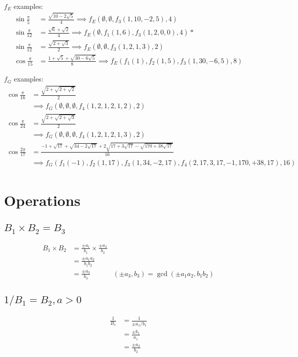 \documentclass{article}
\begin{document}
$f_E$ examples:
\begin{align*}
\sin{\frac{\pi}{5}}  &= \frac{\sqrt{10-2\sqrt{5}}}{4} \implies f_E(\emptyset,\emptyset,f_3(1,10,-2,5),4)\\
\sin{\frac{\pi}{12}} &= \frac{\sqrt{6} + \sqrt{2}}{4} \implies f_E(\emptyset,f_1(1,6),f_3(1,2,0,0),4) *\\
\sin{\frac{\pi}{12}} &= \frac{\sqrt{2 + \sqrt{3}}}{2} \implies f_E(\emptyset,\emptyset,f_3(1,2,1,3),2)\\
\cos{\frac{\pi}{15}} &= \frac{1+\sqrt{5}+\sqrt{30-6\sqrt{5}}}{8} \implies f_E(f_1(1),f_2(1,5),f_3(1,30,-6,5),8)
\end{align*}

$f_G$ examples:
\begin{align*}
\cos{\frac{\pi}{16}} &= \frac{\sqrt{2+\sqrt{2+\sqrt{2}}}}{2}
  \\&\implies f_G(\emptyset,\emptyset,\emptyset,f_4(1,2,1,2,1,2),2)\\
\cos{\frac{\pi}{24}} &= \frac{\sqrt{2+\sqrt{2+\sqrt{3}}}}{2}
  \\&\implies f_G(\emptyset,\emptyset,\emptyset,f_4(1,2,1,2,1,3),2)\\
\cos{\frac{2\pi}{17}} &=
\frac{-1+\sqrt{17}+\sqrt{34-2\sqrt{17}}+2\sqrt{17+3\sqrt{17}-\sqrt{170+38\sqrt{17}}}}{16}
    \\&\implies f_G(f_1(-1),f_2(1,17),f_3(1,34,-2,17),f_4(2,17,3,17,-1,170,+38,17),16)\\
\end{align*}

\section{Operations}

\subsection{$B_1 \times B_2 = B_3$}
\begin{align*}
B_1 \times B_2 &= \frac{\pm a_1}{b_1} \times \frac{\pm a_2}{b_2} \\
  &= \frac{\pm a_1a_2}{b_1b_2} \\
  &= \frac{\pm a_3}{b_3} & (\pm a_3,b_3) = \gcd(\pm a_1a_2, b_1b_2)
\end{align*}

\subsection{$1 / B_1 = B_2, a > 0$}
\begin{align*}
\frac{1}{B_1} &= \frac{1}{\pm a_1 / b_1}\\
 &= \frac{\pm b_1}{a_1} \\
 &= \frac{\pm a_2}{b_2}
\end{align*}
\end{document}
